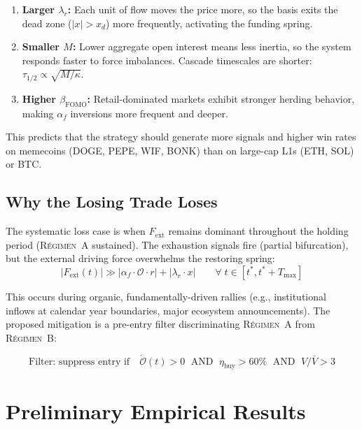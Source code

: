 \documentclass[11pt,a4paper]{article}
\newcommand{\af}{\alpha_f}
\newcommand{\Fext}{F_{\mathrm{ext}}}
\newcommand{\regime}[1]{\textsc{R\'{e}gimen~#1}}
\newcommand{\OI}{\mathcal{O}}
\begin{document}
\begin{enumerate}[nosep]
    \item \textbf{Larger $\lambda_r$:} Each unit of flow moves the price more, 
    so the basis exits the dead zone ($|x| > x_d$) more frequently, activating 
    the funding spring.
    
    \item \textbf{Smaller $M$:} Lower aggregate open interest means less 
    inertia, so the system responds faster to force imbalances. Cascade 
    timescales are shorter: $\tau_{1/2} \propto \sqrt{M/\kappa}$.
    
    \item \textbf{Higher $\beta_{\mathrm{FOMO}}$:} Retail-dominated markets 
    exhibit stronger herding behavior, making $\af$ inversions more frequent 
    and deeper.
\end{enumerate}

This predicts that the strategy should generate more signals and higher 
win rates on memecoins (DOGE, PEPE, WIF, BONK) than on large-cap L1s 
(ETH, SOL) or BTC.


\subsection{Why the Losing Trade Loses}

The systematic loss case is when $\Fext$ remains dominant throughout the 
holding period (\regime{A} sustained). The exhaustion signals fire 
(partial bifurcation), but the external driving force overwhelms the 
restoring spring:
\begin{equation}
|\Fext(t)| \gg |\af \cdot \OI \cdot r| + |\lambda_r \cdot x| 
\qquad \forall\; t \in [t^*, t^* + T_{\max}]
\end{equation}

This occurs during organic, fundamentally-driven rallies (e.g., institutional 
inflows at calendar year boundaries, major ecosystem announcements). The 
proposed mitigation is a pre-entry filter discriminating \regime{A} from 
\regime{B}:

\begin{equation}
\label{eq:regime_filter}
\text{Filter: suppress entry if}\quad 
\dot{\OI}(t) > 0 \;\text{ AND }\; \eta_{\mathrm{buy}} > 60\% 
\;\text{ AND }\; V/\bar{V} > 3
\end{equation}


\section{Preliminary Empirical Results}
\label{sec:results}
\end{document}
